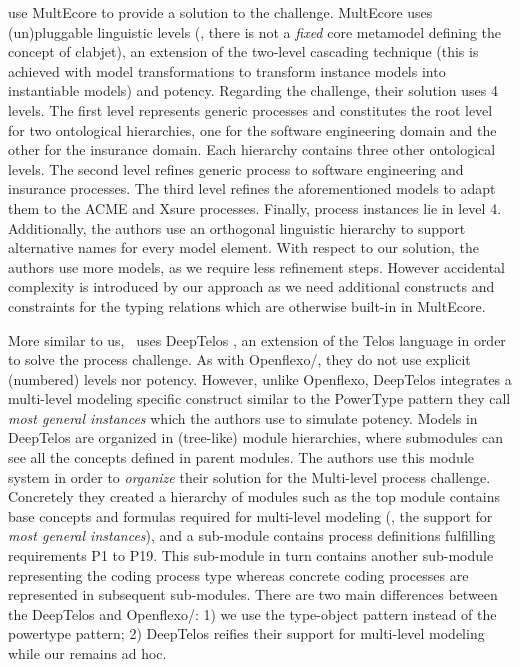 \textcite{multiecore2019} use MultEcore \parencite{multecore2016} to provide a solution to the challenge. MultEcore uses (un)pluggable linguistic levels (\eg, there is not a \emph{fixed} core metamodel defining the concept of clabjet), an extension of the two-level cascading technique \parencite{atkinson2005concepts} (this is achieved with model transformations to transform instance models into instantiable models) and potency. Regarding the challenge, their solution uses 4 levels. 
The first level represents generic processes and constitutes the root level for two ontological hierarchies, one for the software engineering domain and the other for the insurance domain. Each hierarchy contains three other ontological levels. The second level refines generic process to software engineering and insurance processes. The third level refines the aforementioned models to adapt them to the ACME and Xsure processes. Finally, process instances lie in level 4. Additionally, the authors use an orthogonal linguistic hierarchy to support alternative names for every model element. 
With respect to our solution, the authors use more models, as we require less refinement steps. However accidental complexity is introduced by our approach as we need additional constructs and constraints for the typing relations which are otherwise built-in in MultEcore. 



More similar to us,~\textcite{deeptelos2019} uses DeepTelos
\parencite{deeptelos2016}, an extension of the Telos language
\parencite{telos1990} in order to solve the process challenge. As with
Openflexo/\FML, they do not use explicit (numbered) levels nor potency.
However, unlike Openflexo, DeepTelos integrates a multi-level modeling specific
construct similar to the PowerType \parencite{atkinson2001essence} pattern they
call \emph{most general instances} which the authors use to simulate potency.
Models in DeepTelos are organized in (tree-like) module hierarchies, where
submodules can see all the concepts defined in parent modules. The authors use
this module system in order to \emph{organize} their solution for the
Multi-level process challenge. Concretely they created a hierarchy of modules
such as the top module contains base concepts and formulas required for
multi-level modeling (\eg, the support for \emph{most general instances}), and a sub-module contains process definitions fulfilling requirements P1 to P19. This sub-module in turn contains another sub-module representing the coding process type whereas concrete coding processes are represented in subsequent sub-modules. There are two main differences between the DeepTelos and Openflexo/\FML: 1) we use the type-object pattern instead of the powertype pattern; 2) DeepTelos reifies their support for multi-level modeling while our remains ad hoc.


